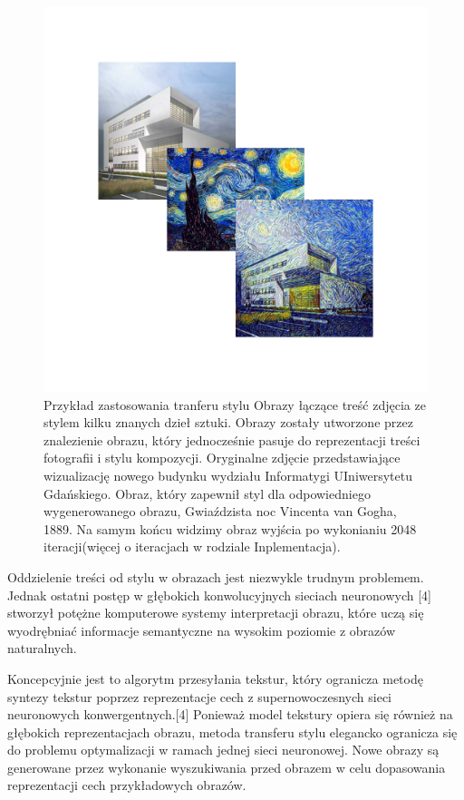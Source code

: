 \documentclass[brudnopis]{xmgr}
\begin{document}
 \begin{figure}[!tbh]
\centering
\includegraphics[width=.8\hsize]{fig/6}
\caption{Przykład zastosowania tranferu stylu
Obrazy łączące treść zdjęcia ze stylem kilku znanych dzieł sztuki. Obrazy zostały utworzone przez znalezienie obrazu, który jednocześnie pasuje do reprezentacji treści fotografii i stylu kompozycji. Oryginalne zdjęcie przedstawiające wizualizację nowego budynku wydziału Informatygi UIniwersytetu Gdańskiego. Obraz, który zapewnił styl dla odpowiedniego wygenerowanego obrazu, Gwiaździsta noc Vincenta van Gogha, 1889. Na samym końcu widzimy obraz wyjścia po wykonianiu 2048 iteracji(więcej o iteracjach w rodziale Inplementacja).
\label{RYS.6}}
\end{figure}


Oddzielenie treści od stylu w  obrazach jest niezwykle trudnym problemem. Jednak ostatni postęp w głębokich konwolucyjnych sieciach neuronowych [4] stworzył potężne komputerowe systemy interpretacji obrazu, które uczą się wyodrębniać informacje semantyczne na wysokim poziomie z obrazów naturalnych.

Koncepcyjnie jest to algorytm przesyłania tekstur, który ogranicza metodę syntezy tekstur poprzez reprezentacje cech z supernowoczesnych sieci neuronowych konwergentnych.[4] Ponieważ model tekstury opiera się również na głębokich reprezentacjach obrazu, metoda transferu stylu elegancko ogranicza się do problemu optymalizacji w ramach jednej sieci neuronowej. Nowe obrazy są generowane przez wykonanie wyszukiwania przed obrazem w celu dopasowania reprezentacji cech przykładowych obrazów.
\end{document}
